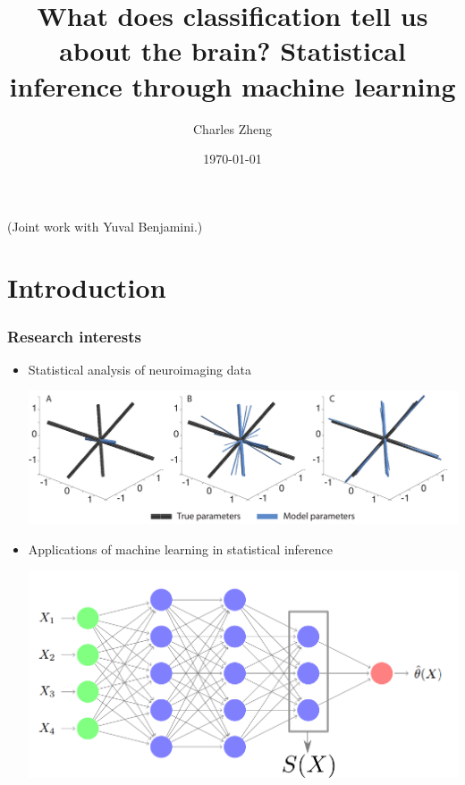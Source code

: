 \documentclass{beamer}
\title[Inference through learning]{What does classification tell us about the brain? Statistical inference through machine learning}
\author{Charles Zheng} %
\institute[Stanford] %
{Stanford University}
\date{\today} %
\begin{document}
\begin{frame}
\titlepage %
(Joint work with Yuval Benjamini.)
\end{frame}

\section{Introduction}

\begin{frame}
\frametitle{Research interests}
\begin{itemize}
\item Statistical analysis of neuroimaging data
\begin{center}
\includegraphics[scale = 0.2]{3D_fit_DTI_NNLS_EBP.pdf}
\end{center}
\item Applications of machine learning in statistical inference
\begin{center}
\includegraphics[scale = 0.2]{dnn_sx.png}
\end{center}
\end{itemize}
\end{frame}
\end{document}
